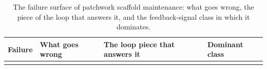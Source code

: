 \documentclass[
  11pt,
]{article}
\begin{document}
\begin{table}[htbp]
\caption{The failure surface of patchwork scaffold maintenance: what goes wrong, the piece of the loop that answers it, and the feedback-signal class in which it dominates.}\label{tab:X-1}
\centering\small
\begin{tabular}{@{}
  >{\raggedright\arraybackslash}p{}
  >{\raggedright\arraybackslash}p{}
  >{\raggedright\arraybackslash}p{}
  >{\raggedright\arraybackslash}p{}@{}}
\toprule\noalign{}
\begin{minipage}[b]{\linewidth}\raggedright
Failure
\end{minipage} & \begin{minipage}[b]{\linewidth}\raggedright
What goes wrong
\end{minipage} & \begin{minipage}[b]{\linewidth}\raggedright
The loop piece that answers it
\end{minipage} & \begin{minipage}[b]{\linewidth}\raggedright
Dominant class
\end{minipage} \\
\midrule\noalign{}



\end{tabular}
\end{table}
\end{document}
